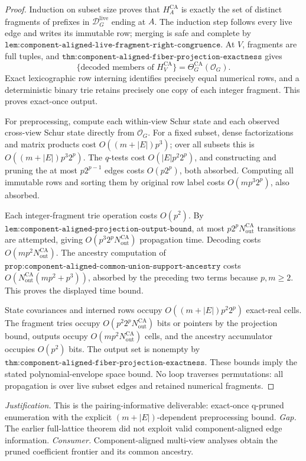 \documentclass{article}
\begin{document}
\begin{proof}
Induction on subset size proves that \(H_A^{\mathrm{CA}}\) is exactly the set of distinct fragments of prefixes in \(\mathcal D_G^{\mathrm{live}}\) ending at \(A\).  The induction step follows every live edge and writes its immutable row; merging is safe and complete by \(\texttt{lem:component-aligned-live-fragment-right-congruence}\).  At \(V\), fragments are full tuples, and \(\texttt{thm:component-aligned-fiber-projection-exactness}\) gives
\[
 \{\text{decoded members of }H_V^{\mathrm{CA}}\}
 =\Theta_G^{\mathrm{CA}}(\mathcal O_G).
\]
Exact lexicographic row interning identifies precisely equal numerical rows, and a deterministic binary trie retains precisely one copy of each integer fragment.  This proves exact-once output.

For preprocessing, compute each within-view Schur state and each observed cross-view Schur state directly from \(\mathcal O_G\).  For a fixed subset, dense factorizations and matrix products cost \(O((m+|E|)p^3)\); over all subsets this is \(O((m+|E|)p^3 2^p)\).  The \(q\)-tests cost \(O(|E|p^2 2^p)\), and constructing and pruning the at most \(p2^{p-1}\) edges costs \(O(p2^p)\), both absorbed.  Computing all immutable rows and sorting them by original row label costs \(O(mp^3 2^p)\), also absorbed.

Each integer-fragment trie operation costs \(O(p^2)\).  By \(\texttt{lem:component-aligned-projection-output-bound}\), at most \(p2^pN_{\mathrm{out}}^{\mathrm{CA}}\) transitions are attempted, giving \(O(p^3 2^pN_{\mathrm{out}}^{\mathrm{CA}})\) propagation time.  Decoding costs \(O(mp^2N_{\mathrm{out}}^{\mathrm{CA}})\).  The ancestry computation of \(\texttt{prop:component-aligned-common-union-support-ancestry}\) costs \(O(N_{\mathrm{out}}^{\mathrm{CA}}(mp^2+p^3))\), absorbed by the preceding two terms because \(p,m\ge2\).  This proves the displayed time bound.

State covariances and interned rows occupy \(O((m+|E|)p^2 2^p)\) exact-real cells.  The fragment tries occupy \(O(p^2 2^pN_{\mathrm{out}}^{\mathrm{CA}})\) bits or pointers by the projection bound, outputs occupy \(O(mp^2N_{\mathrm{out}}^{\mathrm{CA}})\) cells, and the ancestry accumulator occupies \(O(p^2)\) bits.  The output set is nonempty by \(\texttt{thm:component-aligned-fiber-projection-exactness}\).  These bounds imply the stated polynomial-envelope space bound.  No loop traverses permutations: all propagation is over live subset edges and retained numerical fragments.
\end{proof}
\par\smallskip\noindent \textit{Justification.} This is the pairing-informative deliverable: exact-once q-pruned enumeration with the explicit \((m+|E|)\)-dependent preprocessing bound. \textit{Gap.} The earlier full-lattice theorem did not exploit valid component-aligned edge information. \textit{Consumer.} Component-aligned multi-view analyses obtain the pruned coefficient frontier and its common ancestry.
\end{document}
